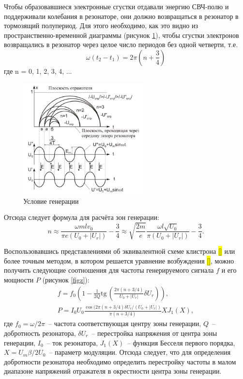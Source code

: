 \documentclass[a4paper,14pt]{extarticle}
\renewcommand{\tan}{\mathrm{tg\,}}
\begin{document}
	Чтобы  образовавшиеся  электронные  сгустки  отдавали  энергию  СВЧ-полю и поддерживали колебания в резонаторе, они должно возвращаться в резонатор в тормозящий полупериод. Для этого необходимо, как это видно из пространственно-временной диаграммы (рисунок \ref{cond}),  чтобы  сгустки  электронов  возвращались  в  резонатор  через целое число периодов без одной четверти, т.е. 
	$$ \omega (t_2 - t_1) = 2\pi \left(n + \frac{3}{4}\right)$$
	где n = 0, 1, 2, 3, 4, ... 
	
	\begin{figure}[h]
		\center
		\includegraphics[width = 0.6\textwidth]{images/12.png}
		\caption{Условие генерации}
		\label{cond}
	\end{figure}
	
	Отсюда следует формула для расчёта зон генерации:
	\begin{equation}
	n \approx \frac{\omega mlv_0}{\pi e(U_0 + |U_r|)} - \frac{3}{4} \approx \sqrt{\frac{2m}{e}}\frac{\omega l\sqrt{U_0}}{\pi (U_0 + |U_r|)} - \frac{3}{4}.
    \label{eq:n}
	\end{equation}
	
	Воспользовавшись представлениями об эквивалентной схеме клистрона \colorbox{yellow}{[]} или более точным методом, в котором решается уравнение возбуждения \colorbox{yellow}{[]}, можно получить следующие соотношения для частоты генерируемого сигнала $f$ и его мощности $P$ (рисунок \ref{figz}):
	\begin{gather}
	f = f_0 \left(1 - \frac{1}{2Q} \tan \left( \frac{2\pi(n + 3/4)}{U_0 + |U_r|} \delta U_r \right)\right), \label{eq:Q}\\
	P = I_0 U_0 \frac{\cos (2\pi (n + 3/4)\delta U_r/(U_0 + |U_r|)}{\pi (n + 3/4)} X J_1(X),
	\end{gather}
	где $f_0 = \omega/2\pi$~-- частота соответствующая центру зоны генерации, $Q$~-- добротность резонатора, $\delta U_r$~-- перестройка напряжения от центра зоны генерации, $I_0$~-- ток резонатора, $J_1(X)$~-- функция Бесселя первого порядка, $X = U_m\beta/2U_0$~-- параметр модуляции. Отсюда следует, что для определения добротности резонатора необходимо определить перестройку частоты в малом диапазоне напряжений отражателя в окрестности центра зоны генерации.
	
\end{document}
